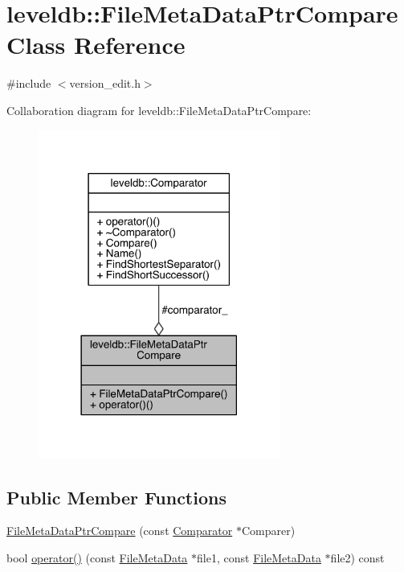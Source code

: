 \hypertarget{classleveldb_1_1_file_meta_data_ptr_compare}{}\section{leveldb\+:\+:File\+Meta\+Data\+Ptr\+Compare Class Reference}
\label{classleveldb_1_1_file_meta_data_ptr_compare}


{\ttfamily \#include $<$version\+\_\+edit.\+h$>$}



Collaboration diagram for leveldb\+:\+:File\+Meta\+Data\+Ptr\+Compare\+:\nopagebreak
\begin{figure}[H]
\begin{center}
\leavevmode
\includegraphics[width=225pt]{classleveldb_1_1_file_meta_data_ptr_compare__coll__graph}
\end{center}
\end{figure}
\subsection*{Public Member Functions}
\begin{DoxyCompactItemize}
\item 
\hyperlink{classleveldb_1_1_file_meta_data_ptr_compare_a24d650d84722557510efb28b3df3dbac}{File\+Meta\+Data\+Ptr\+Compare} (const \hyperlink{structleveldb_1_1_comparator}{Comparator} $\ast$Comparer)
\item 
bool \hyperlink{classleveldb_1_1_file_meta_data_ptr_compare_a42bfcffb808dba83315e5fbb11a22acb}{operator()} (const \hyperlink{structleveldb_1_1_file_meta_data}{File\+Meta\+Data} $\ast$file1, const \hyperlink{structleveldb_1_1_file_meta_data}{File\+Meta\+Data} $\ast$file2) const 
\end{DoxyCompactItemize}
